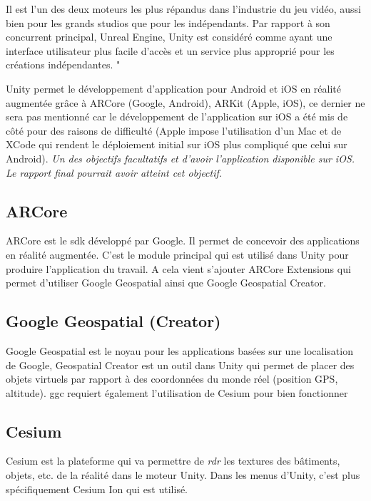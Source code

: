 Il est l'un des deux moteurs les plus répandus dans l'industrie du jeu vidéo,
aussi bien pour les grands studios que pour les indépendants. Par rapport à son concurrent principal,
Unreal Engine, Unity est considéré comme ayant une interface utilisateur plus facile d'accès et un service plus approprié pour les créations indépendantes.
"\cite{UnityMoteurJeu2025}

Unity permet le développement d'application pour Android et iOS en réalité augmentée grâce à ARCore (Google, Android), ARKit (Apple, iOS), ce dernier ne sera pas mentionné car le
développement de l'application sur iOS a été mis de côté pour des raisons de difficulté (Apple impose l'utilisation d'un Mac et de XCode qui rendent le déploiement initial sur iOS plus
compliqué que celui sur Android). \textit{Un des objectifs facultatifs et d'avoir l'application disponible sur iOS. Le rapport final pourrait avoir atteint cet objectif.}

\subsection{ARCore}
ARCore est le \acrshort{sdk} développé par Google. Il permet de concevoir des applications en réalité augmentée. C'est le module principal qui est utilisé dans Unity pour produire l'application du travail.
A cela vient s'ajouter ARCore Extensions qui permet d'utiliser Google Geospatial ainsi que Google Geospatial Creator.
\subsection{Google Geospatial (Creator)}
Google Geospatial est le noyau pour les applications basées sur une localisation de Google, Geospatial Creator est un outil dans Unity qui permet de placer des objets virtuels par rapport à
des coordonnées du monde réel (position GPS, altitude). \acrshort{ggc} requiert également l'utilisation de Cesium pour bien fonctionner


\subsection{Cesium}
Cesium est la plateforme qui va permettre de \textit{\acrshort{rdr}} les textures des bâtiments, objets, etc. de la réalité dans le moteur Unity.
Dans les menus d'Unity, c'est plus spécifiquement Cesium Ion qui est utilisé.

